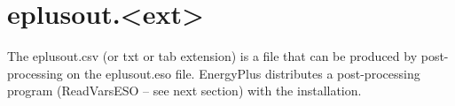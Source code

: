 \section{eplusout.\textless{}ext\textgreater{}}\label{eplusout.ext}

The eplusout.csv (or txt or tab extension) is a file that can be produced by post-processing on the eplusout.eso file. EnergyPlus distributes a post-processing program (ReadVarsESO -- see next section) with the installation.
